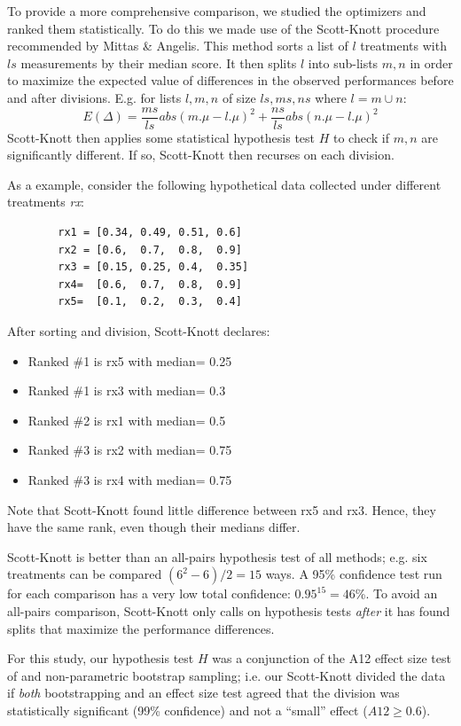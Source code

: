 \documentclass[conference]{IEEEtran}
\newcommand{\bi}{\begin{itemize}}
\newcommand{\ei}{\end{itemize}}
\begin{document}
	
	To provide a more comprehensive comparison, we studied the optimizers and ranked them statistically. To do this we made use of the Scott-Knott procedure recommended by Mittas \& Angelis\cite{mittas13}. This method
	sorts a list of $l$ treatments with $ls$ measurements by their median
	score. It then
	splits $l$ into sub-lists $m,n$ in order to maximize the expected value of
	differences  in the observed performances
	before and after divisions. E.g. for lists $l,m,n$ of size $ls,ms,ns$ where $l=m\cup n$:
	\[E(\Delta)=\frac{ms}{ls}abs(m.\mu - l.\mu)^2 + \frac{ns}{ls}abs(n.\mu - l.\mu)^2\]
	Scott-Knott then applies some statistical hypothesis test $H$ to check
	if $m,n$ are significantly different. If so, Scott-Knott then recurses on each division.
	
	As a example, consider the following hypothetical data collected under different treatments {\em rx}:
	
	{\scriptsize \begin{verbatim}
		rx1 = [0.34, 0.49, 0.51, 0.6]
		rx2 = [0.6,  0.7,  0.8,  0.9]
		rx3 = [0.15, 0.25, 0.4,  0.35]
		rx4=  [0.6,  0.7,  0.8,  0.9]
		rx5=  [0.1,  0.2,  0.3,  0.4]
		\end{verbatim}}
	\noindent
	After sorting and division, Scott-Knott declares:
	\bi
	\item Ranked \#1 is rx5 with median= 0.25
	\item Ranked \#1 is rx3 with median= 0.3
	\item Ranked \#2 is rx1 with median= 0.5
	\item Ranked \#3 is rx2 with median= 0.75
	\item Ranked \#3 is rx4 with median= 0.75
	\ei
	Note that Scott-Knott found  little
	difference between rx5 and rx3. Hence,
	they have the same rank, even though their medians differ.
	
	Scott-Knott is better than an 
	all-pairs hypothesis test of all methods; e.g. six treatments
	can be compared \mbox{$(6^2-6)/2=15$} ways. 
	A 95\% confidence test run for each comparison has  a very low total confidence: 
	\mbox{$0.95^{15} = 46$}\%.
	To avoid an all-pairs comparison, Scott-Knott only calls on hypothesis
	tests {\em after} it has found splits that maximize the performance differences.
	
	For this study, our hypothesis test $H$ was a
	conjunction of the A12 effect size test of  and
	non-parametric bootstrap sampling; i.e. our
	Scott-Knott divided the data if {\em both}
	bootstrapping and an effect size test agreed that
	the division was statistically significant (99\%
	confidence) and not a ``small'' effect ($A12 \ge
	0.6$).
	
\end{document}
